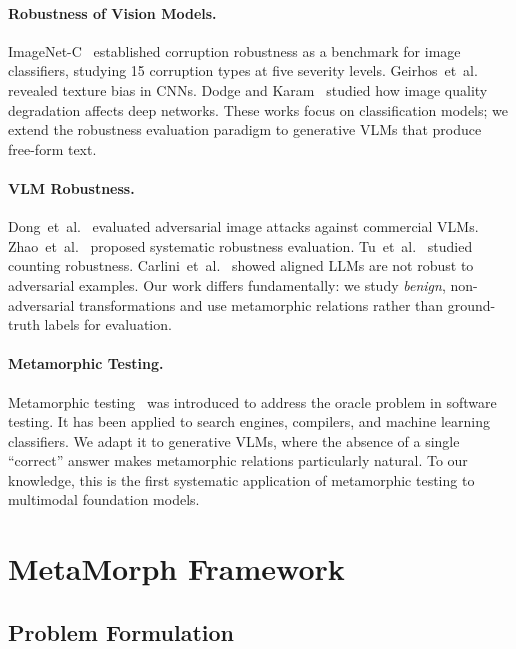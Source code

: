 \documentclass[10pt,twocolumn,letterpaper]{article}
\begin{document}
\paragraph{Robustness of Vision Models.}
ImageNet-C~\cite{hendrycks2019benchmarking} established corruption robustness as a benchmark for image classifiers, studying 15 corruption types at five severity levels. Geirhos~et~al.~\cite{geirhos2019imagenet} revealed texture bias in CNNs. Dodge and Karam~\cite{dodge2016understanding} studied how image quality degradation affects deep networks. These works focus on classification models; we extend the robustness evaluation paradigm to generative VLMs that produce free-form text.

\paragraph{VLM Robustness.}
Dong~et~al.~\cite{dong2023robust} evaluated adversarial image attacks against commercial VLMs. Zhao~et~al.~\cite{zhao2024evaluating} proposed systematic robustness evaluation. Tu~et~al.~\cite{tu2024many} studied counting robustness. Carlini~et~al.~\cite{carlini2024aligned} showed aligned LLMs are not robust to adversarial examples. Our work differs fundamentally: we study \emph{benign}, non-adversarial transformations and use metamorphic relations rather than ground-truth labels for evaluation.

\paragraph{Metamorphic Testing.}
Metamorphic testing~\cite{chen2018metamorphic,segura2016survey} was introduced to address the oracle problem in software testing. It has been applied to search engines, compilers, and machine learning classifiers. We adapt it to generative VLMs, where the absence of a single ``correct'' answer makes metamorphic relations particularly natural. To our knowledge, this is the first systematic application of metamorphic testing to multimodal foundation models.

\section{MetaMorph Framework}
\label{sec:method}

\subsection{Problem Formulation}
\end{document}
